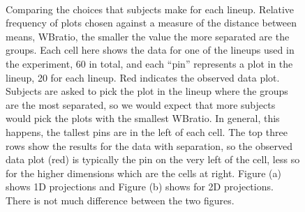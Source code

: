 \begin{figure}[htbp]
\centering
\mbox{\quad
{}}
\caption{Comparing the choices that subjects make for each lineup. Relative frequency of plots chosen against a measure of the distance between means, WBratio, the smaller the value the more separated are the groups. Each cell here shows the data for one of the lineups used in the experiment, 60 in total, and each ``pin'' represents a plot in the lineup, 20 for each lineup. Red indicates the observed data plot. Subjects are asked to pick the plot in the lineup where the groups are the most separated, so we would expect that more subjects would pick the plots with the smallest WBratio. In general, this happens, the tallest pins are in the left of each cell. The top three rows show the results for the data with separation, so the observed data plot (red) is typically the pin on the very left of the cell, less so for the higher dimensions which are the cells at right. Figure (a) shows 1D projections and Figure (b) shows for 2D projections. There is not much difference between the two figures. } 
\label{wbratio}
\end{figure}


